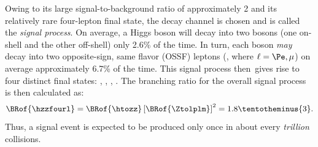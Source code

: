 
Owing to its large signal-to-background ratio of approximately 2
and its relatively rare four-lepton final state, the \hzzfourl decay channel is chosen and is called the \emph{signal process}.
On average, a Higgs boson will decay into two \PZ bosons (one on-shell and the other off-shell) only 2.6\% of the time.
In turn, each \PZ boson \emph{may} decay into two opposite-sign, same flavor (OSSF) leptons (\Ztolplm, where $\ell = \Pe, \mu$) on average approximately 6.7\% of the time.
This signal process then gives rise to four distinct final states: \foure, \fourmu, \twoetwomu, \twomutwoe.
The branching ratio for the overall signal process is then calculated as: %
\begin{equation*}
    \BRof{\hzzfourl} = \BRof{\htozz} \left[ \BRof{\Ztolplm} \right]^2 = 1.8\tentotheminus{3}.
\end{equation*}
Thus, a signal event is expected to be produced only once in about every \emph{trillion} \pp collisions.

